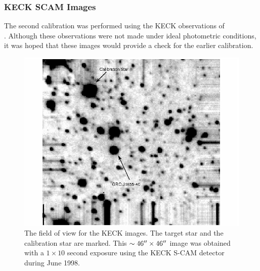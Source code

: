 
\subsubsection{KECK SCAM Images}\label{cha:lightcurve:sec:Photometry:subsec:PhotometricCalibration:subsubsec:keck}

The second calibration was performed using the KECK observations of \\%
\groj. Although these observations were not made under ideal photometric conditions, it was hoped that these images would provide a check for the earlier calibration. %

\begin{figure}[!htb]
\begin{center}
\includegraphics[width=5.0in]{keck00_2}
\caption{%
The field of view for the KECK images. The target star and the
calibration star are marked. This $\sim 46\hbox{$^{\prime\prime}$} \times 46\hbox{$^{\prime\prime}$}$
image was obtained with a $1\times10$ second exposure using the KECK
S-CAM detector during June 1998. }\label{cha:lightcurve:sec:Photometry:subsec:PhotometricCalibration:subsubsec:keck:fig:keck00_2}
\end{center}
\end{figure}

\vspace{\myparskip}

